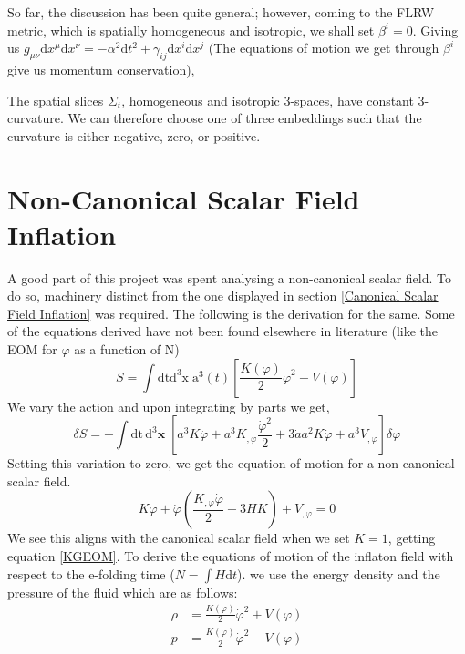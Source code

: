 \documentclass[aps,prd,reprint,preprintnumbers,showpacs,floatfix,nofootinbib,superscript address]{revtex4-2}
\begin{document}
So far, the discussion has been quite general; however, coming to the FLRW metric, which is spatially homogeneous and isotropic, we shall set $\beta^i = 0$. Giving us $g_{\mu \nu} \text{d}x^\mu\text{d}x^\nu = -\alpha^2 \text{d}t^2 + \gamma_{ij}\text{d}x^i\text{d}x^j$ (The equations of motion we get through $\beta^i$ give us momentum conservation),

The spatial slices $\Sigma_t$, homogeneous and isotropic 3-spaces, have constant 3-curvature. We can therefore choose one of three embeddings such that the curvature is either negative, zero, or positive. 

\section{Non-Canonical Scalar Field Inflation} \label{Non-Canonical Scalar Field Inflation}
A good part of this project was spent analysing a non-canonical scalar field. To do so, machinery distinct from the one displayed in section \ref{Canonical Scalar Field Inflation} was required. The following is the derivation for the same. Some of the equations derived have not been found elsewhere in literature (like the EOM for $\varphi$ as a function of N)
\begin{equation} \label{13}
    S = \int \text{dt}\text{d}^3\text{x} \; \text{a}^3(t) \left[ \frac{K(\varphi)}{2}\dot{\varphi}^2 - V(\varphi) \right]
\end{equation}
We vary the action and upon integrating by parts we get,
\begin{equation}
    \delta S = - \int \text{dt}\,\text{d}^3\textbf{x} \; \left[ a^3 K \ddot{\varphi} + a^3K_{,\varphi} \frac{\dot{\varphi}^2}{2}  +  3\dot{a} a^2 K \dot{\varphi} + a^3V_{,\varphi}  \right]\delta \varphi
\end{equation}
Setting this variation to zero, we get the equation of motion for a non-canonical scalar field.
\begin{equation} \label{16}
    K \ddot{\varphi} + \dot{\varphi} \left(\frac{K_{,\varphi} \dot{\varphi}}{2} + 3H K \right) + V_{,\varphi}   = 0
\end{equation}
We see this aligns with the canonical scalar field when we set $K = 1$, getting equation \ref{KGEOM}. To derive the equations of motion of the inflaton field with respect to the e-folding time ($N = \int H \text{d}t$). we use the energy density and the pressure of the fluid which are as follows: 
\begin{align}   \label{18}
    \rho &= \frac{K(\varphi)}{2} \dot{\varphi}^2 + V(\varphi) \nonumber \\
    p &= \frac{K(\varphi)}{2} \dot{\varphi}^2 - V(\varphi)
\end{align}
\end{document}
